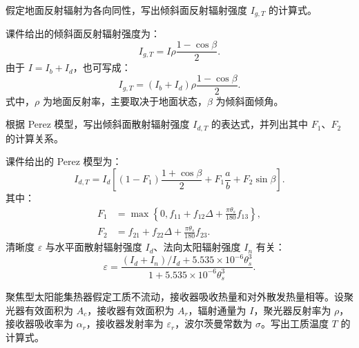 \begin{problem}[倾斜面反射辐射强度]\label{exer:calc_04_solar_p034_01}
假定地面反射辐射为各向同性，写出倾斜面反射辐射强度 \(I_{g,T}\) 的计算式。
\end{problem}

\begin{solution}
课件给出的倾斜面反射辐射强度为：
\begin{equation}
I_{g,T}
= I\rho\frac{1-\cos\beta}{2}.
\end{equation}
由于 \(I = I_b + I_d\)，也可写成：
\begin{equation}
I_{g,T}
= (I_b + I_d)\rho\frac{1-\cos\beta}{2}.
\end{equation}
式中，\(\rho\) 为地面反射率，主要取决于地面状态，\(\beta\) 为倾斜面倾角。
\end{solution}

\begin{problem}[倾斜面散射辐射强度]\label{exer:calc_04_solar_p036_01}
根据 Perez 模型，写出倾斜面散射辐射强度 \(I_{d,T}\) 的表达式，并列出其中 \(F_1\)、\(F_2\) 的计算关系。
\end{problem}

\begin{solution}
课件给出的 Perez 模型为：
\begin{equation}
I_{d,T}
= I_d\left[(1-F_1)\frac{1+\cos\beta}{2}
+ F_1\frac{a}{b}
+ F_2\sin\beta\right].
\end{equation}
其中：
\begin{equation*}
\begin{aligned}
F_1 &= \max\left\{0, f_{11} + f_{12}\Delta + \frac{\pi\theta_s}{180}f_{13}\right\},\\
F_2 &= f_{21} + f_{22}\Delta + \frac{\pi\theta_s}{180}f_{23}.
\end{aligned}
\end{equation*}
清晰度 \(\varepsilon\) 与水平面散射辐射强度 \(I_d\)、法向太阳辐射强度 \(I_n\) 有关：
\begin{equation}
\varepsilon
= \frac{(I_d + I_n)/I_d + 5.535 \times 10^{-6}\theta_s^3}
{1 + 5.535 \times 10^{-6}\theta_s^3}.
\end{equation}
\end{solution}

\begin{problem}[聚焦型太阳能集热器工质温度]\label{exer:calc_04_solar_p065_01}
聚焦型太阳能集热器假定工质不流动，接收器吸收热量和对外散发热量相等。设聚光器有效面积为 \(A_c\)，接收器有效面积为 \(A_r\)，辐射通量为 \(I\)，聚光器反射率为 \(\rho\)，接收器吸收率为 \(\alpha_r\)，接收器发射率为 \(\varepsilon_r\)，波尔茨曼常数为 \(\sigma\)。写出工质温度 \(T\) 的计算式。
\end{problem}

